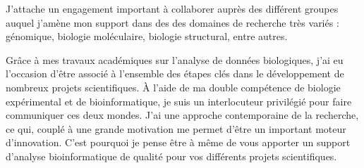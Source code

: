 \documentclass[11pt, a4paper]{awesome-cv}
\begin{document}
\begin{cvletter}

J'attache un engagement important à collaborer auprès des différent groupes auquel j'amène mon support dans des des domaines de recherche très variés : génomique, biologie moléculaire, biologie structural, entre autres.

Grâce à mes travaux académiques sur l’analyse de données biologiques, j’ai eu l’occasion d’être associé à l'ensemble des étapes clés dans le développement de nombreux projets scientifiques. À l’aide de ma double compétence de biologie expérimental et de bioinformatique, je suis un interlocuteur privilégié pour faire communiquer ces deux mondes. J'ai une approche contemporaine de la recherche, ce qui, couplé à une grande motivation me permet d’être un important moteur d’innovation. C'est pourquoi je pense être à même de vous apporter un support d’analyse bioinformatique de qualité pour vos différents projets scientifiques.

\end{cvletter}


\makeletterclosing
\end{document}
